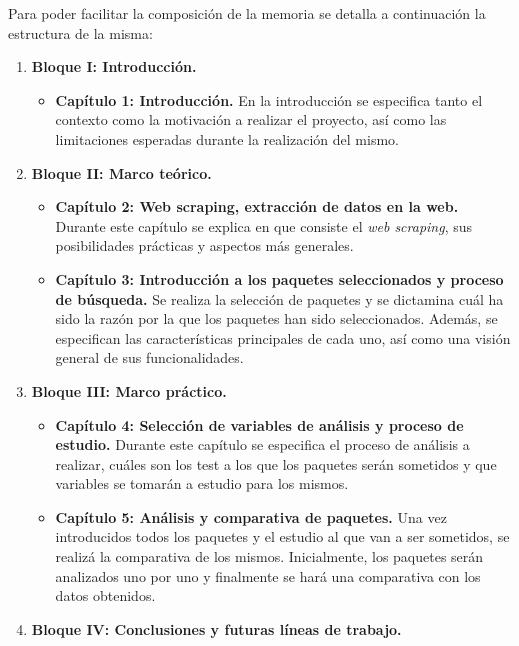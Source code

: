 Para poder facilitar la composición de la memoria se detalla a continuación la estructura de la misma:
\begin{enumerate}
  \item {\bfseries Bloque I: Introducción. }
        \begin{itemize}
          \item {\bfseries Capítulo 1: Introducción. \justify}
                En la introducción se especifica tanto el contexto como la motivación a realizar el 
                proyecto, así como las limitaciones esperadas durante la realización del mismo.
        \end{itemize}
  \item {\bfseries Bloque II: Marco teórico. }
        \begin{itemize}
          \item {\bfseries Capítulo 2: Web scraping, extracción de datos en la web. \justify}
                Durante este capítulo se explica en que consiste el \emph{web scraping}, sus posibilidades 
                prácticas y aspectos más generales.
          \item {\bfseries Capítulo 3: Introducción a los paquetes seleccionados y proceso de búsqueda. \justify}
                Se realiza la selección de paquetes y se dictamina cuál ha sido la razón por la que los 
                paquetes han sido seleccionados. Además, se especifican las características principales 
                de cada uno, así como una visión general de sus funcionalidades.
        \end{itemize}
  \item {\bfseries Bloque III: Marco práctico. }
        \begin{itemize}
          \item {\bfseries Capítulo 4: Selección de variables de análisis y proceso de estudio. \justify}
                Durante este capítulo se especifica el proceso de análisis a realizar, cuáles son los test 
                a los que los paquetes serán sometidos y que variables se tomarán a estudio para los 
                mismos.
          \item {\bfseries Capítulo 5: Análisis y comparativa de paquetes. \justify}
                Una vez introducidos todos los paquetes y el estudio al que van a ser sometidos, se realizá 
                la comparativa de los mismos. Inicialmente, los paquetes serán analizados uno por uno y 
                finalmente se hará una comparativa con los datos obtenidos.
        \end{itemize}
  \item {\bfseries Bloque IV: Conclusiones y futuras líneas de trabajo. }
\end{enumerate}

